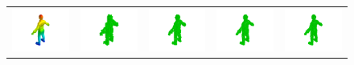 \begin{figure}
\begin{tabular}{ccccc}
 \includegraphics[width=0.19\columnwidth]{Figures/shape_retrieval/pic_person_solid.png} &
 \includegraphics[width=0.19\columnwidth]{Figures/shape_retrieval/pic_person_30_solid.png} &
 \includegraphics[width=0.19\columnwidth]{Figures/shape_retrieval/pic_person_50_solid.png} &
 \includegraphics[width=0.19\columnwidth]{Figures/shape_retrieval/pic_person_70_solid.png} &
 \includegraphics[width=0.19\columnwidth]{Figures/shape_retrieval/pic_person_100_solid.png} \\


\end{tabular}
\end{figure}
